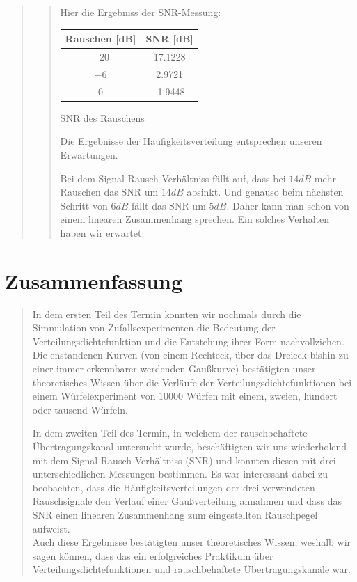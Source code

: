 \begin{quote}
\begin{quote}
        
        Hier die Ergebniss der SNR-Messung:
            \begin{center}
                  \begin{tabular}{|c|c|}
                  \hline
                   Rauschen [dB] &  SNR [dB] \\ \hline 
                   $-20$ &  17.1228 \\ \hline
                   $-6$ &  2.9721 \\ \hline
                   $0$ &  -1.9448 \\ \hline           
                 \end{tabular}\vspace{1em}
                 
            \caption{SNR des Rauschens}            
            \end{center}
    
        Die Ergebnisse der Häufigkeitsverteilung entsprechen unseren Erwartungen. 
    
        Bei dem Signal-Rausch-Verhältniss fällt auf, dass bei $14dB$ mehr Rauschen das SNR um $14dB$ absinkt. Und
        genauso beim nächsten Schritt von $6dB$ fällt das SNR um $5dB$. Daher kann man schon von einem linearen
        Zusammenhang sprechen. Ein solches Verhalten haben wir erwartet. 
        
    \end{quote}
\end{quote}

\section{Zusammenfassung}
\begin{quote}
	In dem ersten Teil des Termin konnten wir nochmals durch die Simmulation von
	Zufallsexperimenten die Bedeutung der Verteilungsdichtefunktion
	und die Entstehung ihrer Form nachvollziehen. Die enstandenen Kurven (von einem
	Rechteck, über das Dreieck bishin zu einer immer erkennbarer werdenden
	Gaußkurve) bestätigten unser theoretisches Wissen über die Verläufe der
	Verteilungsdichtefunktionen bei einem Würfelexperiment von $10000$ Würfen mit einem, 
	zweien, hundert oder tausend Würfeln.\\
	
	\vspace{1em}
	
	In dem zweiten Teil des Termin, in welchem der rauschbehaftete
	Übertragungskanal untersucht wurde, beschäftigten wir uns wiederholend mit dem 
	Signal-Rausch-Verhältniss (SNR) und konnten diesen mit drei unterschiedlichen
	Messungen bestimmen. Es war interessant dabei zu beobachten, dass die Häufigkeitsverteilungen der drei
	verwendeten Rauschsignale den Verlauf einer Gaußverteilung annahmen und dass
	das SNR einen linearen Zusammenhang zum eingestellten Rauschpegel aufweist.\\
	Auch diese Ergebnisse bestätigten unser theoretisches Wissen, weshalb wir sagen
	können, dass das ein erfolgreiches Praktikum über Verteilungsdichtefunktionen
	und rauschbehaftete Übertragungskanäle war.
	
\end{quote}


